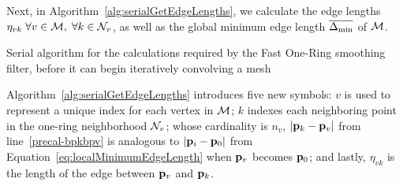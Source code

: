 Next, in Algorithm~\ref{alg:serialGetEdgeLengths}, we calculate the edge lengths $\eta_{vk} \; \forall v \in \mathcal{M}, \; \forall  k \in \mathcal{N}_v$, as well as the global minimum edge length $\overline{\Delta_\text{min}}$ of $\mathcal{M}$.
\begin{algorithm}
	\DontPrintSemicolon


	\bigskip
	\;
\nl	{}
	\caption{Serial algorithm for the calculations required by the Fast One-Ring smoothing filter, before it can begin iteratively convolving a mesh\label{alg:serialGetEdgeLengths}}
\end{algorithm}%
%
%
%

Algorithm~\ref{alg:serialGetEdgeLengths} introduces five new symbols: $v$ is used to represent a unique index for each vertex in $\mathcal{M}$; $k$ indexes each neighboring point in the one-ring neighborhood $\mathcal{N}_v$; whose cardinality is $n_v$, $|\mathbf{p}_k-\mathbf{p}_v|$ from line~\ref{precal-bpkbpv} is analogous to $|\mathbf{p}_i-\mathbf{p}_0|$ from Equation~\ref{eq:localMinimumEdgeLength} when $\mathbf{p}_v$ becomes $\mathbf{p}_0$; and lastly, $\eta_{vk}$ is the length of the edge between $\mathbf{p}_v$ and $\mathbf{p}_k$.
%

